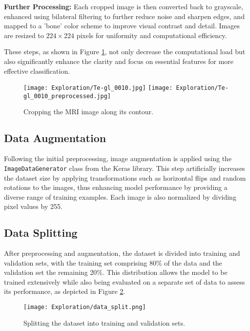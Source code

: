 \textbf{Further Processing:} Each cropped image is then converted back to grayscale, enhanced using bilateral filtering to further reduce noise and sharpen edges, and mapped to a 'bone' color scheme to improve visual contrast and detail. Images are resized to $224 \times 224$
 pixels for uniformity and computational efficiency.

These steps, as shown in Figure \ref{fig:image_cropping}, not only decrease the computational load but also significantly enhance the clarity and focus on essential features for more effective classification.

\begin{figure}[H]
  \begin{center}
    \texttt{[image: Exploration/Te-gl\_0010.jpg]}
    \texttt{[image: Exploration/Te-gl\_0010\_preprocessed.jpg]}
  \end{center}
  \caption{Cropping the MRI image along its contour.}\label{fig:image_cropping}
\end{figure}

\subsection{Data Augmentation}\label{data_augmentation}

Following the initial preprocessing, image augmentation is applied using the \texttt{ImageDataGenerator} class from the Keras library. This step artificially increases the dataset size by applying transformations such as horizontal flips and random rotations to the images, thus enhancing model performance by providing a diverse range of training examples. Each image is also normalized by dividing pixel values by 255.

\subsection{Data Splitting}\label{data_splitting}
After preprocessing and augmentation, the dataset is divided into training and validation sets, with the training set comprising 80\% of the data and the validation set the remaining 20\%. This distribution allows the model to be trained extensively while also being evaluated on a separate set of data to assess its performance, as depicted in Figure \ref{fig:data_split}.

\begin{figure}[H]
  \begin{center}
    \texttt{[image: Exploration/data\_split.png]}
  \end{center}
  \caption{Splitting the dataset into training and validation sets.}\label{fig:data_split}
\end{figure}


